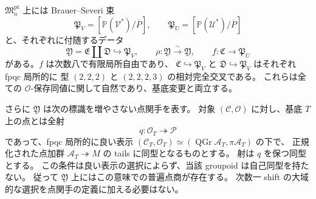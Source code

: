 \begin{theorem}
\label{thm:point-omarked-descent}
$\mathfrak M_n^{\mathrm{pt}}$ 上には Brauer--Severi 束
\[
 \mathfrak P_V=[\mathbb P(\mathcal V^*)/\overline P],
 \qquad
 \mathfrak P_U=[\mathbb P(\mathcal U^*)/\overline P]
\]
と、それぞれに付随するデータ
\[
 \mathfrak Y=\mathfrak E\amalg\mathfrak D\hookrightarrow\mathfrak P_V,
 \qquad \rho:\mathfrak Y\xrightarrow{\sim}\mathfrak Y,
 \qquad f:\mathfrak C\longrightarrow\mathfrak P_U
\]
がある。$f$ は次数八で有限局所自由であり、
$\mathfrak C\hookrightarrow\mathfrak P_V$ と
$\mathfrak D\hookrightarrow\mathfrak P_V$ はそれぞれ fpqc 局所的に
型 $(2,2,2)$ と $(2,2,2,3)$ の相対完全交叉である。
これらは全ての $\mathcal O$-保存同値に関して自然であり、基底変更と両立する。

さらに $\mathfrak Y$ は次の標識を増やさない点関手を表す。
対象 $(\mathscr C,\mathcal O)$ に対し、基底 $T$ 上の点とは全射
\[
 q:\mathcal O_T\twoheadrightarrow\mathcal P
\]
であって、fpqc 局所的に良い表示
$(\mathscr C_T,\mathcal O_T)\simeq
 (\operatorname{QGr}\mathcal A_T,\pi\mathcal A_T)$ の下で、
正規化された点加群 $\mathcal A_T\twoheadrightarrow M$ の tails に同型となるものとする。
射は $q$ を保つ同型とする。
この条件は良い表示の選択によらず、当該 groupoid は自己同型を持たない。
従って $\mathfrak Y$ 上にはこの意味での普遍点商が存在する。
次数一 shift の大域的な選択を点関手の定義に加える必要はない。
\end{theorem}

